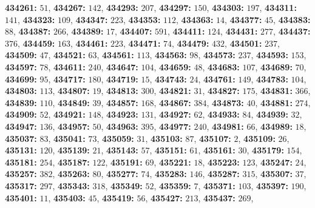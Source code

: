 \textsf{\bfseries 434261:} $51$, \textsf{\bfseries 434267:} $142$, \textsf{\bfseries 434293:} $207$, \textsf{\bfseries 434297:} $150$, \textsf{\bfseries 434303:} $197$, \textsf{\bfseries 434311:} $141$, \textsf{\bfseries 434323:} $109$, \textsf{\bfseries 434347:} $223$, \textsf{\bfseries 434353:} $112$, \textsf{\bfseries 434363:} $14$, \textsf{\bfseries 434377:} $45$, \textsf{\bfseries 434383:} $88$, \textsf{\bfseries 434387:} $266$, \textsf{\bfseries 434389:} $17$, \textsf{\bfseries 434407:} $591$, \textsf{\bfseries 434411:} $124$, \textsf{\bfseries 434431:} $277$, \textsf{\bfseries 434437:} $376$, \textsf{\bfseries 434459:} $163$, \textsf{\bfseries 434461:} $223$, \textsf{\bfseries 434471:} $74$, \textsf{\bfseries 434479:} $432$, \textsf{\bfseries 434501:} $237$, \textsf{\bfseries 434509:} $47$, \textsf{\bfseries 434521:} $63$, \textsf{\bfseries 434561:} $113$, \textsf{\bfseries 434563:} $98$, \textsf{\bfseries 434573:} $237$, \textsf{\bfseries 434593:} $153$, \textsf{\bfseries 434597:} $78$, \textsf{\bfseries 434611:} $240$, \textsf{\bfseries 434647:} $104$, \textsf{\bfseries 434659:} $48$, \textsf{\bfseries 434683:} $107$, \textsf{\bfseries 434689:} $70$, \textsf{\bfseries 434699:} $95$, \textsf{\bfseries 434717:} $180$, \textsf{\bfseries 434719:} $15$, \textsf{\bfseries 434743:} $24$, \textsf{\bfseries 434761:} $149$, \textsf{\bfseries 434783:} $104$, \textsf{\bfseries 434803:} $113$, \textsf{\bfseries 434807:} $19$, \textsf{\bfseries 434813:} $300$, \textsf{\bfseries 434821:} $31$, \textsf{\bfseries 434827:} $175$, \textsf{\bfseries 434831:} $366$, \textsf{\bfseries 434839:} $110$, \textsf{\bfseries 434849:} $39$, \textsf{\bfseries 434857:} $168$, \textsf{\bfseries 434867:} $384$, \textsf{\bfseries 434873:} $40$, \textsf{\bfseries 434881:} $274$, \textsf{\bfseries 434909:} $52$, \textsf{\bfseries 434921:} $148$, \textsf{\bfseries 434923:} $131$, \textsf{\bfseries 434927:} $62$, \textsf{\bfseries 434933:} $84$, \textsf{\bfseries 434939:} $32$, \textsf{\bfseries 434947:} $136$, \textsf{\bfseries 434957:} $50$, \textsf{\bfseries 434963:} $395$, \textsf{\bfseries 434977:} $240$, \textsf{\bfseries 434981:} $66$, \textsf{\bfseries 434989:} $18$, \textsf{\bfseries 435037:} $83$, \textsf{\bfseries 435041:} $73$, \textsf{\bfseries 435059:} $31$, \textsf{\bfseries 435103:} $87$, \textsf{\bfseries 435107:} $2$, \textsf{\bfseries 435109:} $26$, \textsf{\bfseries 435131:} $120$, \textsf{\bfseries 435139:} $21$, \textsf{\bfseries 435143:} $57$, \textsf{\bfseries 435151:} $61$, \textsf{\bfseries 435161:} $30$, \textsf{\bfseries 435179:} $154$, \textsf{\bfseries 435181:} $254$, \textsf{\bfseries 435187:} $122$, \textsf{\bfseries 435191:} $69$, \textsf{\bfseries 435221:} $18$, \textsf{\bfseries 435223:} $123$, \textsf{\bfseries 435247:} $24$, \textsf{\bfseries 435257:} $382$, \textsf{\bfseries 435263:} $80$, \textsf{\bfseries 435277:} $74$, \textsf{\bfseries 435283:} $146$, \textsf{\bfseries 435287:} $315$, \textsf{\bfseries 435307:} $37$, \textsf{\bfseries 435317:} $297$, \textsf{\bfseries 435343:} $318$, \textsf{\bfseries 435349:} $52$, \textsf{\bfseries 435359:} $7$, \textsf{\bfseries 435371:} $103$, \textsf{\bfseries 435397:} $190$, \textsf{\bfseries 435401:} $11$, \textsf{\bfseries 435403:} $45$, \textsf{\bfseries 435419:} $56$, \textsf{\bfseries 435427:} $213$, \textsf{\bfseries 435437:} $269$, 
